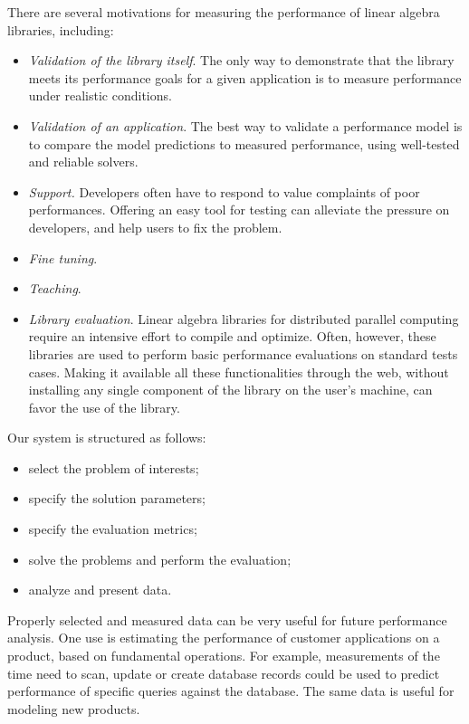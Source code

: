 \documentclass[11pt,relax]{SANDreport}
\begin{document}
There are several motivations for measuring
the performance of linear algebra libraries, including:
\begin{itemize}
\item {\sl Validation of the library itself}.
The only way to demonstrate that the library meets its
performance goals for a given application is to measure performance under realistic
conditions.
\item {\sl Validation of an application}. The best way to validate a
performance model is to compare the model predictions to measured
performance, using well-tested and reliable solvers.
\item {\sl Support.} Developers often have to respond to value complaints of
poor performances. Offering an easy tool for testing can alleviate the
pressure on developers, and help users to fix the problem.
\item {\sl Fine tuning}.
\item {\sl Teaching}.
\item {\sl Library evaluation}.
Linear algebra libraries for distributed parallel computing require an
intensive effort to compile and optimize. Often, however, these libraries are
used to perform basic performance evaluations on standard tests cases. Making
it available all these functionalities through the
web, without installing any single component of the library on the user's
machine, can favor the use of the library.
\end{itemize}

Our system is structured as follows:
\begin{itemize}
\item select the problem of interests;
\item specify the solution parameters;
\item specify the evaluation metrics;
\item solve the problems and perform the evaluation;
\item analyze and present data.
\end{itemize}

Properly selected and
measured data can be very useful for future performance analysis.
One use is estimating the performance of customer applications on
a product, based on fundamental operations. For example,
measurements of the time need to scan, update or create database
records could be used to predict performance of specific queries
against the database. The same data is useful for modeling new
products.
\end{document}
